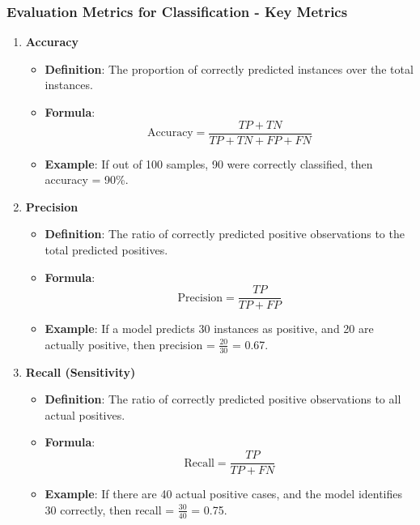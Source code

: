 \documentclass[aspectratio=169]{beamer}
\begin{document}
\begin{frame}[fragile]
  \frametitle{Evaluation Metrics for Classification - Key Metrics}
  \begin{enumerate}
    \item \textbf{Accuracy}
      \begin{itemize}
        \item \textbf{Definition}: The proportion of correctly predicted instances over the total instances.
        \item \textbf{Formula}:
          \[
          \text{Accuracy} = \frac{TP + TN}{TP + TN + FP + FN}
          \]
        \item \textbf{Example}: If out of 100 samples, 90 were correctly classified, then accuracy = 90\%.
      \end{itemize}

    \item \textbf{Precision}
      \begin{itemize}
        \item \textbf{Definition}: The ratio of correctly predicted positive observations to the total predicted positives.
        \item \textbf{Formula}:
          \[
          \text{Precision} = \frac{TP}{TP + FP}
          \]
        \item \textbf{Example}: If a model predicts 30 instances as positive, and 20 are actually positive, then precision = \( \frac{20}{30} \) = 0.67.
      \end{itemize}

    \item \textbf{Recall (Sensitivity)}
      \begin{itemize}
        \item \textbf{Definition}: The ratio of correctly predicted positive observations to all actual positives.
        \item \textbf{Formula}:
          \[
          \text{Recall} = \frac{TP}{TP + FN}
          \]
        \item \textbf{Example}: If there are 40 actual positive cases, and the model identifies 30 correctly, then recall = \( \frac{30}{40} \) = 0.75.
      \end{itemize}
  \end{enumerate}
\end{frame}
\end{document}
